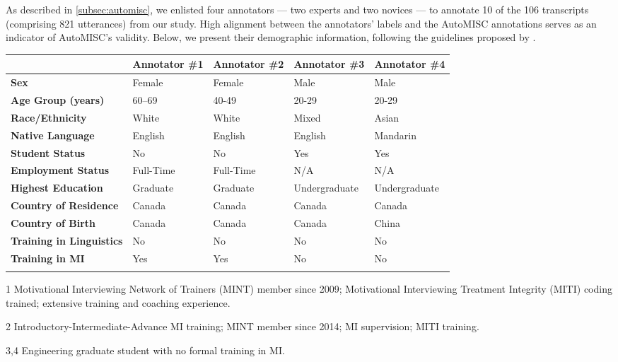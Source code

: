 As described in \cref{subsec:automisc}, we enlisted four annotators --- two experts and two novices --- to annotate 10 of the 106 transcripts (comprising 821 utterances) from our study. High alignment between the annotators' labels and the AutoMISC annotations serves as an indicator of AutoMISC's validity. Below, we present their demographic information, following the guidelines proposed by \citet{bender-friedman-2018-data}.


\renewcommand{\arraystretch}{1.1} %

\begin{table}[!ht]
\centering
\begin{threeparttable}

\begin{tabular}{%
  @{}p{}
  p{}
  p{}
  p{}
  p{}@{}}
\toprule
 & \textbf{Annotator \#1\tnote{1}} 
 & \textbf{Annotator \#2\tnote{2}} 
 & \textbf{Annotator \#3\tnote{3}} 
 & \textbf{Annotator \#4\tnote{3}} \\
\midrule
\arrayrulecolor{gray!50} 
\textbf{Sex} & Female & Female & Male & Male\\
\hline
\textbf{Age Group (years)} & 60--69 & 40-49 & 20-29 &20-29 \\
\hline
\textbf{Race/Ethnicity} & White & White & Mixed & Asian\\
\hline
\textbf{Native Language} & English & English & English & Mandarin\\
\hline
\textbf{Student Status} & No & No & Yes & Yes\\
\hline
\textbf{Employment Status} & Full-Time & Full-Time & N/A & N/A\\
\hline
\textbf{Highest Education} & Graduate & Graduate & Undergraduate & Undergraduate \\
\hline
\textbf{Country of Residence} & Canada & Canada & Canada & Canada\\
\hline
\textbf{Country of Birth} & Canada & Canada & Canada & China\\
\hline
\textbf{Training in Linguistics} & No & No & No& No\\
\hline
\textbf{Training in MI} & Yes & Yes & No & No\\
\arrayrulecolor{black}
\bottomrule
\end{tabular}

\begin{tablenotes}
\footnotesize
\item[1] 
 Motivational Interviewing Network of Trainers (MINT) member since 2009; 
 Motivational Interviewing Treatment Integrity (MITI) coding trained; extensive training 
 and coaching experience.
\item[2]
 Introductory-Intermediate-Advance MI training;
 MINT member since 2014;
 MI supervision; MITI training.
 \item[3,4]
 Engineering graduate student with no formal training in MI.
\end{tablenotes}


\end{threeparttable}
\end{table}
